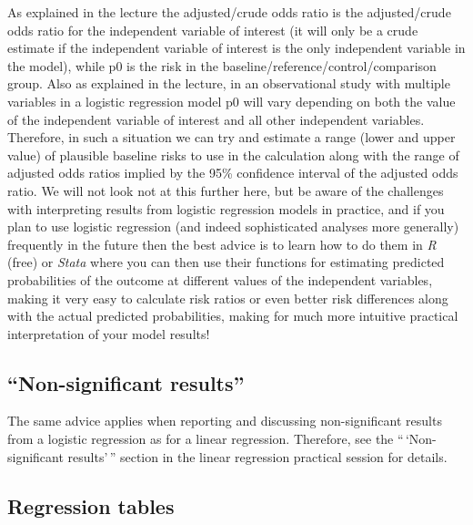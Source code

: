 \documentclass[
]{book}
\begin{document}
As explained in the lecture the adjusted/crude odds ratio is the adjusted/crude odds ratio for the independent variable of interest (it will only be a crude estimate if the independent variable of interest is the only independent variable in the model), while p0 is the risk in the baseline/reference/control/comparison group. Also as explained in the lecture, in an observational study with multiple variables in a logistic regression model p0 will vary depending on both the value of the independent variable of interest and all other independent variables. Therefore, in such a situation we can try and estimate a range (lower and upper value) of plausible baseline risks to use in the calculation along with the range of adjusted odds ratios implied by the 95\% confidence interval of the adjusted odds ratio. We will not look not at this further here, but be aware of the challenges with interpreting results from logistic regression models in practice, and if you plan to use logistic regression (and indeed sophisticated analyses more generally) frequently in the future then the best advice is to learn how to do them in \emph{R} (free) or \emph{Stata} where you can then use their functions for estimating predicted probabilities of the outcome at different values of the independent variables, making it very easy to calculate risk ratios or even better risk differences along with the actual predicted probabilities, making for much more intuitive practical interpretation of your model results!

\hypertarget{non-significant-results-1}{%
\subsection{``Non-significant results''}\label{non-significant-results-1}}

The same advice applies when reporting and discussing non-significant results from a logistic regression as for a linear regression. Therefore, see the ``\,`Non-significant results'\,'' section in the linear regression practical session for details.

\hypertarget{regression-tables-1}{%
\subsection{Regression tables}\label{regression-tables-1}}
\end{document}

